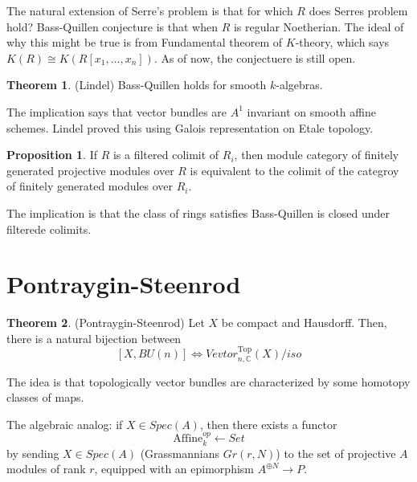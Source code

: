 \documentclass{article}
\theoremstyle{definition}
\newtheorem{theorem}{Theorem}[section]
\theoremstyle{definition}
\theoremstyle{definition}
\theoremstyle{definition}
\newtheorem{proposition}{Proposition}[theorem]
\theoremstyle{definition}
\theoremstyle{definition}
\theoremstyle{definition}
\begin{document}
The natural extension of Serre's problem is that for which $R$ does Serres problem hold? Bass-Quillen conjecture is that when $R$ is regular Noetherian. The ideal of why this might be true is from Fundamental theorem of $K$-theory, which says $K(R)\cong K(R[x_1,...,x_n])$. As of now, the conjectuere is still open.


\begin{tcolorbox}[colback=red!5!white,colframe=red!30!white]
\begin{theorem}
(Lindel) Bass-Quillen holds for smooth $k$-algebras. 
\end{theorem}
\end{tcolorbox}
The implication says that vector bundles are $A^1$ invariant on smooth affine schemes. Lindel proved this using Galois representation on Etale topology. 


\begin{tcolorbox}[colback=blue!5!white,colframe=blue!30!white]
\begin{proposition}
If $R$ is a filtered colimit of $R_i$, then module category of finitely generated projective modules over $R$ is equivalent to the colimit of the categroy of finitely generated modules over $R_i$. 
\end{proposition}
\end{tcolorbox}
The  implication is that the class of rings satisfies Bass-Quillen is closed under filterede colimits. 

\section*{Pontraygin-Steenrod}

\begin{tcolorbox}[colback=red!5!white,colframe=red!30!white]
\begin{theorem}
(Pontraygin-Steenrod) Let $X$ be compact and Hausdorff. Then, there is a natural bijection between
\[[X, BU(n)]\Longleftrightarrow Vevtor_{n,\mathbb{C}}^{\textrm{Top}}(X)/iso\]
\end{theorem}
\end{tcolorbox}
The idea is that topologically vector bundles are characterized by some homotopy classes of maps.

The algebraic analog: if $X\in Spec(A)$, then there exists a functor 
\[\textrm{Affine}_k^{op}\longleftarrow Set\]
by sending $X\in Spec(A)$ (Grassmannians $Gr(r,N)$) to the set of projective $A$ modules of rank $r$, equipped with an epimorphism $A ^{\oplus N}\longrightarrow P$. 
\end{document}
